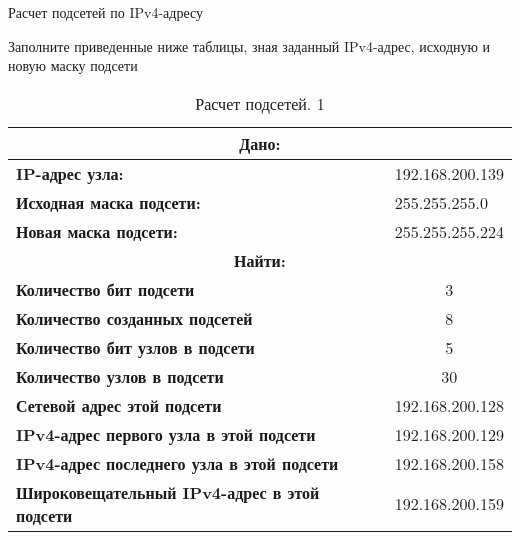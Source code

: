 \documentclass[a4paper,14pt]{extarticle}
\begin{document}
\begin{mypart}{Расчет подсетей по IPv4-адресу}
	
	\begin{step}{Заполните приведенные ниже таблицы, зная заданный IPv4-адрес, исходную и
			новую маску подсети}
		
\begin{table}[h!]
		\caption{Расчет подсетей. 1}
		\centering
		\begin{tabular}{|l|l|}
			\hline
			\multicolumn{2}{|c|}{\textbf{Дано:}}  \\ \hline
			\multicolumn{ 1}{|l|}{\textbf{IP-адрес узла:}} & 192.168.200.139 \\ \hline
			\textbf{Исходная маска подсети:} & 255.255.255.0 \\ \hline
			\textbf{Новая маска подсети:} & 255.255.255.224 \\ \hline
			\multicolumn{2}{|c|}{\textbf{Найти:}}  \\ \hline
			\multicolumn{ 1}{|l|}{\textbf{Количество бит подсети}} & \multicolumn{1}{c|}{3}\\  \hline
			\textbf{Количество созданных подсетей} & \multicolumn{1}{c|}{8} \\ \hline
			\textbf{Количество бит узлов в подсети} & \multicolumn{1}{c|}{5} \\ \hline
			\textbf{Количество узлов в подсети} & \multicolumn{1}{c|}{30} \\ \hline
			\textbf{Сетевой адрес этой подсети} & 192.168.200.128 \\ \hline
			\textbf{IPv4-адрес первого узла в этой подсети} & 192.168.200.129 \\ \hline
			\textbf{IPv4-адрес последнего узла в этой подсети} & 192.168.200.158 \\ \hline
			\textbf{Широковещательный IPv4-адрес в этой подсети} & 192.168.200.159 \\ \hline
		\end{tabular}
		\label{}
	\end{table}



\end{step}
\end{mypart}
\end{document}
